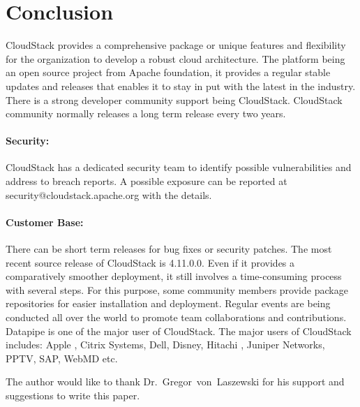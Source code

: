 \section{Conclusion}

CloudStack provides a comprehensive package or unique features and flexibility for the 
organization to develop a robust cloud architecture. The platform being an open source project
from Apache foundation, it provides a regular stable updates and releases that enables it to 
stay in put with the latest in the industry. There is a strong developer community support
being CloudStack. CloudStack community normally releases a long term release every two years.

\paragraph {Security:} CloudStack has a dedicated security team to identify possible vulnerabilities 
and address to breach reports. A possible exposure can be reported at security@cloudstack.apache.org
with the details.  

\paragraph {Customer Base:} There can be short term releases for bug fixes or security patches.
The most recent source release of CloudStack is 4.11.0.0. Even if it provides a comparatively smoother deployment,
it still involves a time-consuming process with several steps. For this purpose, some community 
members provide package repositories for easier installation and deployment. 
Regular events are being conducted all over the world to promote team collaborations and 
contributions. Datapipe is one of the major user of CloudStack. The major users of CloudStack
includes: Apple , Citrix Systems, Dell, Disney, Hitachi , Juniper Networks, PPTV, SAP, 
WebMD etc. 


\begin{acks}

  The author would like to thank Dr.~Gregor~von~Laszewski for his
  support and suggestions to write this paper.

\end{acks}


 
